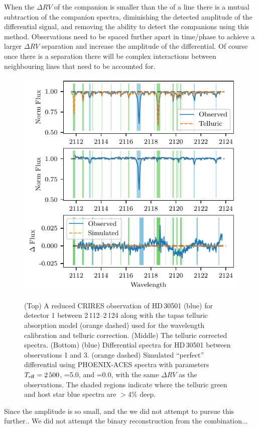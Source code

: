 When the \(\Delta {RV}\) of the companion is smaller than the {\fwhm} of a line there is a mutual subtraction of the companion spectra, diminishing the detected amplitude of the differential signal, and removing the ability to detect the companions using this method. Observations need to be spaced further apart in time/phase to achieve a larger \(\Delta {RV}\) separation and increase the amplitude of the differential. Of course once there is a separation there will be complex interactions between neighbouring lines that need to be accounted for.

\begin{figure}
    \centering
    \includegraphics[width=0.8\hsize]{figures/direct-recovery/differential.pdf}\\
    \caption{(Top) A reduced {CRIRES} observation of {HD\,30501} (blue) for detector 1 between 2\,112--2\,124\nm{} along with the tapas telluric absorption model ({orange} dashed) used for the wavelength calibration and telluric correction.
        (Middle) The telluric corrected spectra.
        (Bottom) ({blue}) Differential spectra for {HD\,30501} between observations 1 and 3. ({orange} dashed) Simulated ``perfect'' differential using {PHOENIX-ACES} spectra with parameters \(T_{\mathrm{eff}}{}=2\,500\)\K{}, \logg{}=5.0, and \feh{}=0.0, with the same \(\Delta {RV}\) as the observations.
        The shaded regions indicate where the telluric {green} and host star {blue} spectra are \(> 4\%\) deep.}
    \label{fig:spectral_example}
\end{figure}

Since the amplitude is so small, and the we did not attempt to pursue this further..
We did not attempt the binary reconstruction from the combination...

